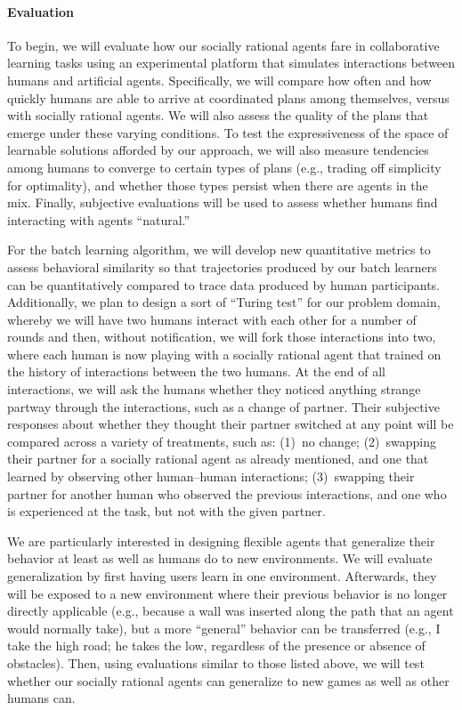 
\vspace{\up}
\paragraph{Evaluation}

To begin, we will evaluate how our socially rational agents fare in
collaborative learning tasks using an experimental platform that
simulates interactions between humans and artificial agents.
Specifically, we will compare how often and how quickly humans are
able to arrive at coordinated plans among themselves, versus with
socially rational agents.  We will also assess the quality of the
plans that emerge under these varying conditions.  To test the
expressiveness of the space of learnable solutions afforded by our
approach, we will also measure tendencies among humans to converge to
certain types of plans (e.g., trading off simplicity for optimality),
and whether those types persist when there are agents in the mix.
Finally, subjective evaluations will be used to assess whether humans
find interacting with agents ``natural.''

For the batch learning algorithm, we will develop new quantitative
metrics to assess behavioral similarity so that trajectories produced
by our batch learners can be quantitatively compared to trace data
produced by human participants.  Additionally, we plan to design a
sort of ``Turing test'' for our problem domain, whereby we will have
two humans interact with each other for a number of rounds and then,
without notification, we will fork those interactions into two, where
each human is now playing with a socially rational agent that trained
on the history of interactions between the two humans.  At the end of
all interactions, we will ask the humans whether they noticed anything
strange partway through the interactions, such as a change of partner.
Their subjective responses about whether they thought their partner
switched at any point will be compared across a variety of treatments,
such as: (1)~no change; (2)~swapping their partner for a
socially rational agent as already mentioned, and one that learned by
observing other human--human interactions; (3)~swapping their partner
for another human who observed the previous interactions, and one who
is experienced at the task, but not with the given partner.

We are particularly interested in designing flexible agents that
generalize their behavior at least as well as humans do to new
environments.  We will evaluate generalization by first having users
learn in one environment.  Afterwards, they will be exposed to a new
environment where their previous behavior is no longer directly
applicable (e.g., because a wall was inserted along the path that an
agent would normally take), but a more ``general'' behavior can be
transferred (e.g., I take the high road; he takes the low, regardless
of the presence or absence of obstacles).  Then, using evaluations
similar to those listed above, we will test whether our
socially rational agents can generalize to new games as well as other
humans can.

